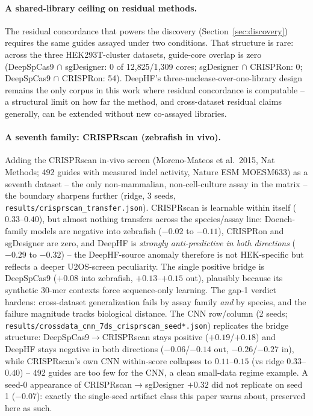 \documentclass[12pt]{article}
\begin{document}
\paragraph{A shared-library ceiling on residual methods.} The residual
concordance that powers the discovery (Section~\ref{sec:discovery})
requires the same guides assayed under two conditions. That structure is
rare: across the three HEK293T-cluster datasets, guide-core overlap is
zero (DeepSpCas9 $\cap$ sgDesigner: 0 of 12{,}825/1{,}309 cores;
sgDesigner $\cap$ CRISPRon: 0; DeepSpCas9 $\cap$ CRISPRon: 54). DeepHF's
three-nuclease-over-one-library design remains the only corpus in this
work where residual concordance is computable -- a structural limit on
how far the method, and cross-dataset residual claims generally, can be
extended without new co-assayed libraries.
\paragraph{A seventh family: CRISPRscan (zebrafish in vivo).} Adding the
CRISPRscan in-vivo screen (Moreno-Mateos et al.\ 2015, Nat Methods;
492 guides with measured indel activity, Nature ESM MOESM633) as a
seventh dataset -- the only non-mammalian, non-cell-culture assay in the
matrix -- the boundary sharpens further (ridge, 3 seeds,
\texttt{results/crisprscan\_transfer.json}). CRISPRscan is learnable
within itself ($0.33$--$0.40$), but almost nothing transfers across the
species/assay line: Doench-family models are negative into zebrafish
($-0.02$ to $-0.11$), CRISPRon and sgDesigner are zero, and DeepHF is
\emph{strongly anti-predictive in both directions} ($-0.29$ to $-0.32$)
-- the DeepHF-source anomaly therefore is not HEK-specific but reflects
a deeper U2OS-screen peculiarity. The single positive bridge is
DeepSpCas9 ($+0.08$ into zebrafish, $+0.13$--$+0.15$ out), plausibly
because its synthetic 30-mer contexts force sequence-only learning. The
gap-1 verdict hardens: cross-dataset generalization fails by assay family
\emph{and} by species, and the failure magnitude tracks biological
distance. The CNN row/column (2 seeds;
\texttt{results/crossdata\_cnn\_7ds\_crisprscan\_seed*.json})
replicates the bridge structure: DeepSpCas9$\to$CRISPRscan stays positive
($+0.19$/$+0.18$) and DeepHF stays negative in both directions
($-0.06$/$-0.14$ out, $-0.26$/$-0.27$ in), while CRISPRscan's own CNN
within-score collapses to $0.11$--$0.15$ (vs ridge $0.33$--$0.40$) --
492 guides are too few for the CNN, a clean small-data regime example. A
seed-0 appearance of CRISPRscan$\to$sgDesigner $+0.32$ did not replicate
on seed 1 ($-0.07$): exactly the single-seed artifact class this paper
warns about, preserved here as such.
\end{document}
